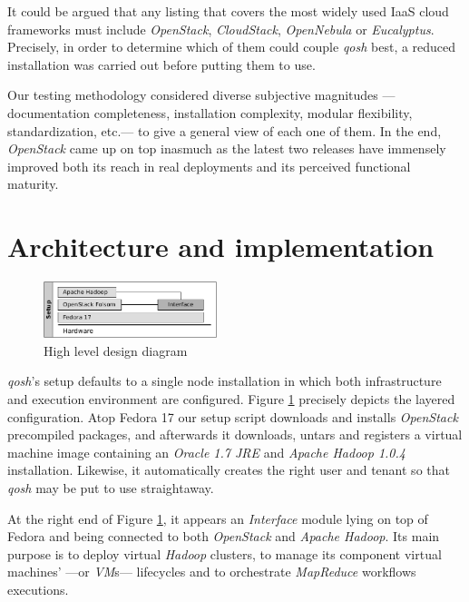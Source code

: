 \documentclass{sig-alternate}
\begin{document}
It could be argued that any listing that covers the most widely used IaaS cloud frameworks must include \emph{OpenStack}, \emph{CloudStack}, \emph{OpenNebula} or \emph{Eucalyptus}. Precisely, in order to determine which of them could couple \emph{qosh} best, a reduced installation was carried out before putting them to use.

Our testing methodology considered diverse subjective magnitudes ---documentation completeness, installation complexity, modular flexibility, standardization, etc.--- to give a general view of each one of them. In the end, \emph{OpenStack} came up on top inasmuch as the latest two releases have immensely improved both its reach in real deployments and its perceived functional maturity.



\section{Architecture and implementation}\label{sec:arch}

\begin{figure}[tp]
\centering
\includegraphics[width=0.45\textwidth]{img/002}
\caption{High level design diagram}
\label{fig:arch1}
\end{figure}

\noindent \emph{qosh}'s setup defaults to a single node installation in which both infrastructure and execution environment are configured. Figure \ref{fig:arch1} precisely depicts the layered configuration. Atop Fedora 17 our setup script downloads and installs \emph{OpenStack} precompiled packages, and afterwards it downloads, untars and registers a virtual machine image containing an \emph{Oracle 1.7 JRE} and \emph{Apache Hadoop 1.0.4} installation. Likewise, it automatically creates the right user and tenant so that \emph{qosh} may be put to use straightaway.

At the right end of Figure \ref{fig:arch1}, it appears an \emph{Interface} module lying on top of Fedora and being connected to both \emph{OpenStack} and \emph{Apache Hadoop}. Its main purpose is to deploy virtual \emph{Hadoop} clusters, to manage its component virtual machines' ---or \emph{VM}s--- lifecycles and to orchestrate \emph{MapReduce} workflows executions.
\end{document}
